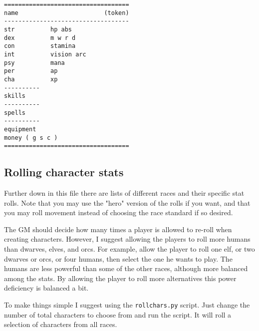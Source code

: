 \goodbreak \begin{samepage} \begin{verbatim}
===================================
name                        (token)
-----------------------------------
str          hp abs
dex          m w r d
con          stamina
int          vision arc
psy          mana
per          ap
cha          xp
----------
skills
----------
spells
----------
equipment
money ( g s c )
===================================
\end{verbatim} \end{samepage}


\subsection*{Rolling character stats}
Further down in this file there are lists of different races and their specific stat rolls. Note that you may use the "hero" version of the rolls if you want, and that you may roll movement instead of choosing the race standard if so desired.

The GM should decide how many times a player is allowed to re-roll when creating characters. However, I suggest allowing the players to roll more humans than dwarves, elves, and orcs. For example, allow the player to roll one elf, or two dwarves or orcs, or four humans, then select the one he wants to play. The humans are less powerful than some of the other races, although more balanced among the stats. By allowing the player to roll more alternatives this power deficiency is balanced a bit.

To make things simple I suggest using the \verb|rollchars.py| script. Just change the number of total characters to choose from and run the script. It will roll a selection of characters from all races.




